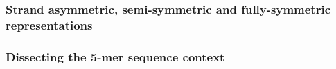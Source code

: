 \subsubsection{Strand asymmetric, semi-symmetric and fully-symmetric representations}



\subsubsection{Dissecting the 5-mer sequence context}

